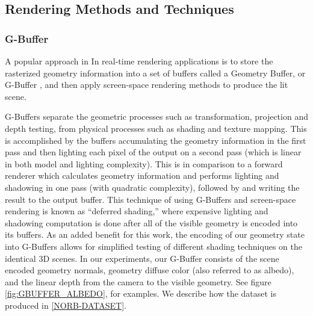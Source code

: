 \documentclass[10pt,twocolumn,letterpaper]{article}
\begin{document}

\subsection{Rendering Methods and Techniques}

\subsubsection{G-Buffer}

A popular approach in In real-time rendering applications is to store the rasterized geometry information into a set of buffers called a Geometry Buffer, or G-Buffer \cite{Saito:1990:CRS:97879.97901}, and then apply screen-space rendering methods to produce the lit scene.

G-Buffers separate the geometric processes such as transformation, projection and depth testing, from physical processes such as shading and texture mapping. This is accomplished by the buffers accumulating the geometry information in the first pass and then lighting each pixel of the output on a second pass (which is linear in both model and lighting complexity).  This is in comparison to a forward renderer which calculates geometry information and performs lighting and shadowing in one pass (with quadratic complexity), followed by and writing the result to the output buffer. This technique of using G-Buffers and screen-space rendering is known as ``deferred shading,'' where expensive lighting and shadowing computation is done after all of the visible geometry is encoded into its buffers.
 As an added benefit for this work, the encoding of our geometry state into G-Buffers allows for simplified testing of different shading techniques on the identical 3D scenes.
In our experiments, our G-Buffer consists of the scene encoded geometry normals, geometry diffuse color (also referred to as albedo), and the linear depth from the camera to the visible geometry.  See figure \ref{fig:GBUFFER_ALBEDO}, for examples. We describe how the dataset is produced in \ref{NORB-DATASET}.
\end{document}
